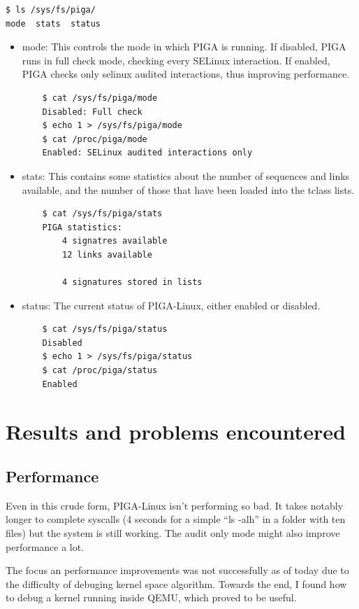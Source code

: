 \documentclass[pdftex,a4paper,titlepage,11pt]{article}
\begin{document}
\begin{lstlisting}
$ ls /sys/fs/piga/
mode  stats  status
\end{lstlisting}

\begin{itemize}
	\item mode: This controls the mode in which PIGA is running. If disabled,
PIGA runs in full check mode, checking every SELinux interaction. If enabled,
PIGA checks only selinux audited interactions, thus improving performance.
	\begin{lstlisting}
	$ cat /sys/fs/piga/mode
	Disabled: Full check
	$ echo 1 > /sys/fs/piga/mode
	$ cat /proc/piga/mode
	Enabled: SELinux audited interactions only
	\end{lstlisting}
	\item stats: This contains some statistics about the number of sequences and
links available, and the number of those that have been loaded into the tclass
lists.
	\begin{lstlisting}
	$ cat /sys/fs/piga/stats
	PIGA statistics:
		4 signatres available
		12 links available

		4 signatures stored in lists
	\end{lstlisting}
	\item status: The current status of PIGA-Linux, either enabled or disabled.
	\begin{lstlisting}
	$ cat /sys/fs/piga/status
	Disabled
	$ echo 1 > /sys/fs/piga/status
	$ cat /proc/piga/status
	Enabled
	\end{lstlisting}
\end{itemize}

\newpage

\section{Results and problems encountered}

\subsection{Performance}

Even in this crude form, PIGA-Linux isn't performing so bad. It takes notably
longer to complete syscalls (4 seconds for a simple ``ls -alh'' in a folder with
ten files) but the system is still working. The audit only mode might also
improve performance a lot.

The focus an performance improvements was not successfully as of today due to
the difficulty of debuging kernel space algorithm. Towards the end, I found
how to debug a kernel running inside QEMU, which proved to be useful.
\end{document}
